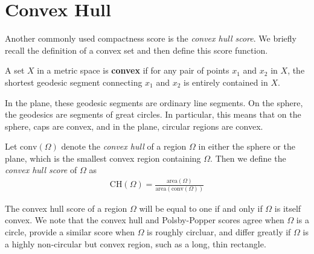 \section{Convex Hull}\label{sec:ch}
Another commonly used compactness score is the \textit{convex hull
score}.  We briefly recall the definition of a convex set and then
define this score function.

\begin{definition}
A set $X$ in a metric space is \textbf{convex} if for any pair of
points $x_1$ and $x_2$ in $X$, the shortest geodesic segment
connecting $x_1$ and $x_2$ is entirely contained in $X$. 
\end{definition}
In the plane, these geodesic segments are ordinary line segments.  On
the sphere, the geodesics are segments of great circles. In 
particular, this means that on the sphere, caps are 
convex, and in the plane, circular regions are convex.

\begin{definition}
Let $\mathrm{conv}(\Omega)$ denote the \textit{convex hull} of
a region $\Omega$ in either the sphere or the plane, which is the
smallest convex region containing $\Omega$.  Then we define the
\textit{convex hull score} of $\Omega$ as 
\begin{align*}
  \mathrm{CH}(\Omega)=
  \frac{\mathrm{area}(\Omega)}{\mathrm{area}(\mathrm{conv}(\Omega))}
\end{align*}
\end{definition}

The convex hull score of a region $\Omega$  will be equal to one if
and only if $\Omega$ is itself convex.  We note that the convex hull
and Polsby-Popper scores agree when $\Omega$ is a circle, provide
a similar score when $\Omega$ is roughly circluar, and differ greatly
if $\Omega$ is a highly non-circular but convex region, such as
a long, thin rectangle.


